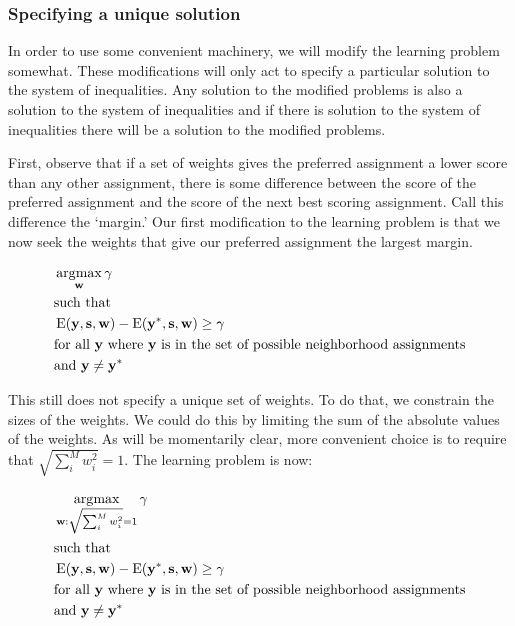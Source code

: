 \subsubsection{Specifying a unique solution}
In order to use some convenient machinery, we will modify the learning
problem somewhat. These modifications will only act to specify a
particular solution to the system of inequalities. Any solution to the
modified problems is also a solution to the system of inequalities and
if there is solution to the system of inequalities there will be a
solution to the modified problems.

First, observe that if a set of weights gives the preferred assignment
a lower score than any other assignment, there is some difference
between the score of the preferred assignment and the score of the
next best scoring assignment. Call this difference the `margin.' Our
first modification to the learning problem is that we now seek the
weights that give our preferred assignment the largest margin.

\begin{align}
&\operatorname*{\arg\!\max}_{\mathbf{w}} \mathbf{\gamma} \\
&\text{such that} \\
&\operatorname{E}(\mathbf{y}, \mathbf{s}, \mathbf{w})
- \operatorname{E}(\mathbf{y}^*, \mathbf{s}, \mathbf{w}) \geq \gamma\\ 
&\text{for all } \mathbf{y} \text{ where } \mathbf{y} \text{ is in the set of
  possible neighborhood assignments}\\
&\text{and } \mathbf{y} \neq \mathbf{y}^*
\end{align}

This still does not specify a unique set of weights. To do that, we
constrain the sizes of the weights. We could do this by limiting the
sum of the absolute values of the weights. As will be momentarily
clear, more convenient choice is to require that $\sqrt{\sum_i^M w_i^2}
  = 1$. The learning problem is now:

%
\begin{align*}
&\operatorname*{\arg\!\max}_{\mathbf{w}:\sqrt{\sum_i^M w_i^2}=1} \mathbf{\gamma} \\
&\text{such that} \\
&\operatorname{E}(\mathbf{y}, \mathbf{s}, \mathbf{w})
- \operatorname{E}(\mathbf{y}^*, \mathbf{s}, \mathbf{w}) \geq \gamma\\ 
&\text{for all } \mathbf{y} \text{ where } \mathbf{y} \text{ is in the set of
  possible neighborhood assignments}\\
&\text{and } \mathbf{y} \neq \mathbf{y}^*
\end{align*}
%

